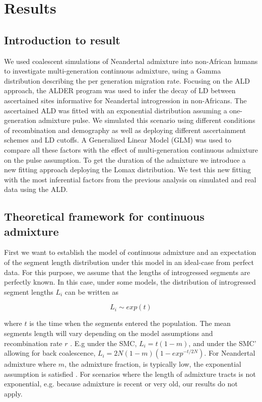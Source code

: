 \documentclass[]{article}
\begin{document}
\section{Results}\label{results}

\subsection{Introduction to result}\label{introduction to result}

We used coalescent simulations of Neandertal admixture into non-African humans to investigate multi-generation continuous admixture, using a Gamma distribution describing the per generation migration rate. Focusing on the ALD approach, the ALDER program was used to infer the decay of LD between ascertained sites informative for Neandertal introgression in non-Africans. The ascertained ALD was fitted with an exponential distribution assuming a one-generation admixture pulse.  We simulated this scenario using different conditions of recombination and demography as well as deploying different ascertainment schemes and LD cutoffs. A Generalized Linear Model (GLM) was used to compare all these factors with the effect of multi-generation continuous admixture on the pulse assumption. To get the duration of the admixture we introduce a new fitting approach deploying the Lomax distribution. We test this new fitting with the most inferential factors from the previous analysis on simulated and real data using the ALD.

\subsection{Theoretical framework for continuous admixture}\label{theoretical framework for continuous admixture}

First we want to establish the model of continuous admixture and an
expectation of the segment length distribution under this model in an
ideal-case from perfect data. For this purpose, we assume that the
lengths of introgressed segments are perfectly known. In this case, under
some models, the distribution of introgressed segment lengths \(L_i\) can
be written as

\begin{equation}
L_i \sim exp(t)
\end{equation}

where $t$ is the time when the segments entered the population. The mean segments length will vary  depending on the model assumptions and
recombination rate \(r\) \citep{liang_lengths_2014}. E.g under the SMC,
\(L_i = t(1-m)\), and under the SMC' allowing for back coalescence,
\(L_i = 2N(1-m)(1-exp^{-t/2N})\). For Neandertal admixture where
\(m\), the admixture fraction, is typically low, the exponential
assumption is satisfied \citep{liang_lengths_2014}. For scenarios where
the length of admixture tracts is not exponential, e.g. because
admixture is recent or very old, our results do not apply.
\end{document}
